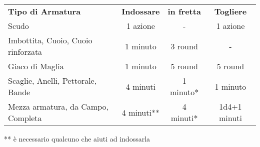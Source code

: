 \documentclass[a4paper,12 pt,openany]{book}
\begin{document}
\begin{textblock*}{18cm}
\begin{tabular}{lccc}
\textbf{Tipo di Armatura}& \textbf{Indossare} & \textbf{in fretta} & \textbf{Togliere}\\
Scudo								& 1 azione 	& -     	& 1 azione\\
Imbottita, Cuoio, Cuoio rinforzata  & 1 minuto	& 3 round  	& - \\
Giaco di Maglia						& 1 minuto	& 5 round  & 5 round\\
Scaglie, Anelli, Pettorale, Bande   & 4 minuti 	& 1 minuto{*}  & 1 minuto\\
Mezza armatura, da Campo, Completa  & 4 minuti{*}{*}& 4 minuti{*}& 1d4+1 minuti\\
\end{tabular}
\medskip

** è necessario qualcuno che aiuti ad indossarla

\end{textblock*}
\end{document}
